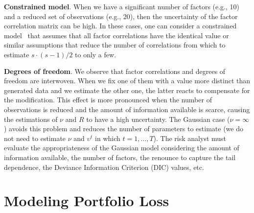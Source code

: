 \documentclass[11pt,fleqn]{book} %
\begin{document}
\textbf{Constrained model}. When we have a significant number of factors 
(e.g., 10) and a reduced set of observations (e.g., 20), then the uncertainty 
of the factor correlation matrix can be high. In these cases, one can consider 
a constrained model~\cite{roncalli:2004} that assumes that all factor
correlations have the identical value or similar assumptions that reduce the 
number of correlations from which to estimate $s \cdot(s-1)/2$ to only a few.

\textbf{Degrees of freedom}. We observe that factor correlations and degrees 
of freedom are interwoven. When we fix one of them with a value more distinct 
than generated data and we estimate the other one, the latter reacts to 
compensate for the modification. This effect is more pronounced when the 
number of observations is reduced and the amount of 
information available is scarce, causing the estimations of $\nu$ and $R$
to have a high uncertainty. The Gaussian case ($\nu = \infty$) avoids this 
problem and reduces the number of parameters to estimate (we do not need to 
estimate $\nu$ and $\upsilon^t$ in which $t=1,\dots,T$). 
The risk analyst must evaluate the appropriateness of the Gaussian model 
considering the amount of information available, the number of factors, 
the renounce to capture the tail dependence, the Deviance Information 
Criterion (DIC) values, etc.


\chapter{Modeling Portfolio Loss}

\end{document}
